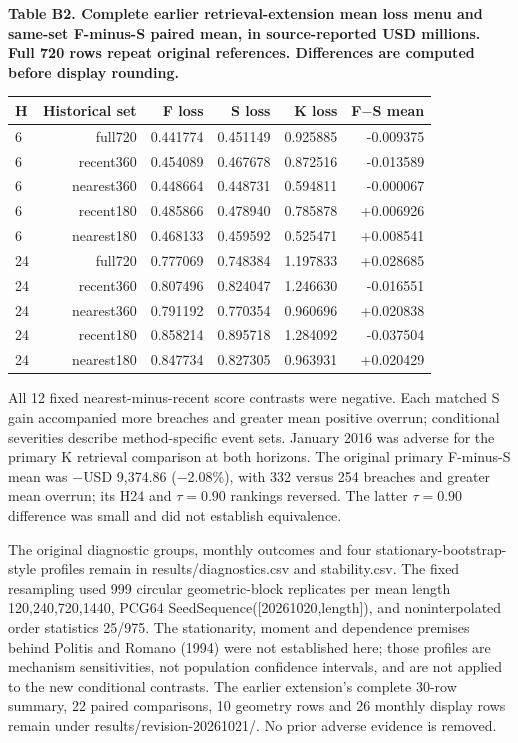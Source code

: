 \documentclass[10pt,a4paper]{article}
\begin{document}
\begin{center}
\begin{minipage}{\linewidth}
\small\textbf{Table B2. Complete earlier retrieval-extension mean loss menu and same-set F-minus-S paired mean, in source-reported USD millions. Full 720 rows repeat original references. Differences are computed before display rounding.}\par\medskip
\centering\fontsize{8}{10}\selectfont
\begin{tabular}{lrrrrr}
\toprule
H & Historical set & F loss & S loss & K loss & F\(-\)S mean \\
\midrule
6 & full720 & 0.441774 & 0.451149 & 0.925885 & -0.009375 \\
6 & recent360 & 0.454089 & 0.467678 & 0.872516 & -0.013589 \\
6 & nearest360 & 0.448664 & 0.448731 & 0.594811 & -0.000067 \\
6 & recent180 & 0.485866 & 0.478940 & 0.785878 & +0.006926 \\
6 & nearest180 & 0.468133 & 0.459592 & 0.525471 & +0.008541 \\
24 & full720 & 0.777069 & 0.748384 & 1.197833 & +0.028685 \\
24 & recent360 & 0.807496 & 0.824047 & 1.246630 & -0.016551 \\
24 & nearest360 & 0.791192 & 0.770354 & 0.960696 & +0.020838 \\
24 & recent180 & 0.858214 & 0.895718 & 1.284092 & -0.037504 \\
24 & nearest180 & 0.847734 & 0.827305 & 0.963931 & +0.020429 \\
\bottomrule
\end{tabular}
\end{minipage}
\end{center}
All 12 fixed nearest-minus-recent score contrasts were negative. Each matched S gain accompanied more breaches and greater mean positive overrun; conditional severities describe method-specific event sets. January 2016 was adverse for the primary K retrieval comparison at both horizons. The original primary F-minus-S mean was \(-\)USD 9,374.86 (\(-\)2.08\%), with 332 versus 254 breaches and greater mean overrun; its H24 and \(\tau=0.90\) rankings reversed. The latter \(\tau=0.90\) difference was small and did not establish equivalence.

The original diagnostic groups, monthly outcomes and four stationary-bootstrap-style profiles remain in results/diagnostics.csv and stability.csv. The fixed resampling used 999 circular geometric-block replicates per mean length 120,240,720,1440, PCG64 SeedSequence([20261020,length]), and noninterpolated order statistics 25/975. The stationarity, moment and dependence premises behind Politis and Romano (1994) were not established here; those profiles are mechanism sensitivities, not population confidence intervals, and are not applied to the new conditional contrasts. The earlier extension's complete 30-row summary, 22 paired comparisons, 10 geometry rows and 26 monthly display rows remain under results/revision-20261021/. No prior adverse evidence is removed.
\end{document}
